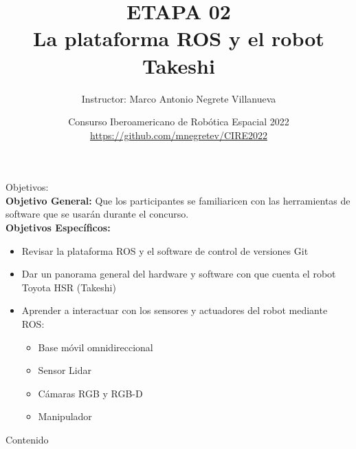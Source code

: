 \documentclass[10pt,spanish,aspectratio=1610]{beamer}
\begin{document}
\renewcommand{\tablename}{Tabla}
\renewcommand{\figurename}{Figura}

\title[Etapa 02 - ROS y Takeshi]{ETAPA 02\\La plataforma ROS y el robot Takeshi}
\author[Marco Negrete]{Instructor: Marco Antonio Negrete Villanueva}
\date[CIRE 2022]{Consurso Iberoamericano de Robótica Espacial 2022\\\url{https://github.com/mnegretev/CIRE2022}}

\begin{frame}
\titlepage
\end{frame}

\begin{frame}
  \Large{Objetivos:}
  \normalsize
  \[\]
  \textbf{Objetivo General:} Que los participantes se familiaricen con las herramientas de software que se usarán durante el concurso. 
  \\
  \textbf{Objetivos Específicos:}
  \begin{itemize}
  \item Revisar la plataforma ROS y el software de control de versiones Git
  \item Dar un panorama general del hardware y software con que cuenta el robot Toyota HSR (Takeshi)
  \item Aprender a interactuar con los sensores y actuadores del robot mediante ROS:
    \begin{itemize}
    \item Base móvil omnidireccional
    \item Sensor Lidar
    \item Cámaras RGB y RGB-D
    \item Manipulador
    \end{itemize}
  \end{itemize}
\end{frame}

\begin{frame}
  \Large{Contenido}
  \normalsize
  \[\]

  \tableofcontents
\end{frame}

\end{document}

